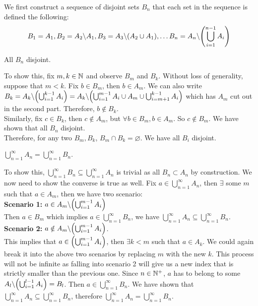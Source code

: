 \begin{prf*}
We first construct a sequence of disjoint sets $B_n$ that each set in the sequence is defined the following: 
$$B_1 = A_1, B_2 = A_2 \backslash A_1, B_3 = A_3\backslash (A_2\cup A_1), \dots B_n = A_n \backslash \qty(\bigcup_{i=1}^{n-1}A_i)$$ 
\begin{clm}
All $B_n$ disjoint.
\end{clm}

To show this, fix $m, k\in \mathbb{N}$ and observe $B_m$ and $B_k$. Without loss of generality, suppose that $m<k$. Fix $b\in B_m$, then $b\in A_m$. We can also write $B_k = A_k \backslash \qty(\bigcup_{i=1}^{k-1}A_i) = A_k \backslash \qty(\bigcup_{i=1}^{m-1}A_i \cup A_m \cup \bigcup_{i=m+1}^{k-1}A_i)$ which has $A_m$ cut out in the second part. Therefore, $b\notin B_k$. \\

Similarly, fix $c\in B_k$, then $c\notin A_m$, but $\forall b\in B_m, b\in A_m$. So $c\notin B_m$. We have shown that all $B_n$ disjoint. \\

Therefore, for any two $B_m, B_k$, $B_m\cap B_k = \varnothing$. We have all $B_i$ disjoint. 

\begin{clm} 
$\bigcup_{n=1}^\infty A_n = \bigcup_{n=1}^\infty B_n$.	
\end{clm}

To show this, $\bigcup_{n=1}^\infty B_n \subseteq \bigcup_{n=1}^\infty A_n$ is trivial as all $B_n \subset A_n$ by construction. We now need to show the converse is true as well. Fix $a\in \bigcup_{n=1}^\infty A_n$, then $\exists$ some $m$ such that $a\in A_m$, then we have two scenario: \\

\noindent \textbf{Scenario 1: } $a\in A_m \backslash \qty(\bigcup_{i=1}^{m-1}A_i)$\\
Then $a\in B_m$ which implies $a\in \bigcup_{n=1}^\infty B_n$, we have $\bigcup_{n=1}^\infty A_n \subseteq \bigcup_{n=1}^\infty B_n$. \\



\noindent \textbf{Scenario 2: } $a\notin A_m \backslash \qty(\bigcup_{i=1}^{m-1}A_i)$.\\
This implies that $a\in \qty(\bigcup_{i=1}^{m-1}A_i)$, then $\exists k<m$ such that $a\in A_k$. We could again break it into the above two scenarios by replacing $m$ with the new $k$. This process will not be infinite as falling into scenario 2 will give us a new index that is strictly smaller than the previous one. Since $n\in \mathbb{N}^+$, $a$ has to belong to some $A_l\backslash \qty(\bigcup_{i=1}^{l-1}A_i) = B_l$. Then $a\in \bigcup_{n=1}^\infty B_n$. We have shown that $\bigcup_{n=1}^\infty A_n \subseteq \bigcup_{n=1}^\infty B_n$, therefore  $\bigcup_{n=1}^\infty A_n = \bigcup_{n=1}^\infty B_n$. \\


\end{prf*}
